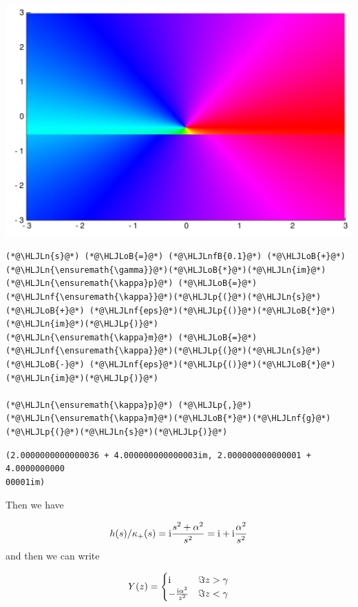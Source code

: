 \documentclass[12pt,a4paper]{article}
\newcommand{\HLJLn}[1]{#1}
\newcommand{\HLJLnf}[1]{\textcolor[RGB]{66,102,213}{#1}}
\newcommand{\HLJLnfB}[1]{\textcolor[RGB]{59,151,46}{#1}}
\newcommand{\HLJLoB}[1]{\textcolor[RGB]{102,102,102}{\textbf{#1}}}
\newcommand{\HLJLp}[1]{#1}
\def\I{ {\rm i} }
\begin{document}
\includegraphics[width=\linewidth]{figures/Solutions4_16_1.pdf}

\begin{lstlisting}
(*@\HLJLn{s}@*) (*@\HLJLoB{=}@*) (*@\HLJLnfB{0.1}@*) (*@\HLJLoB{+}@*) (*@\HLJLn{\ensuremath{\gamma}}@*)(*@\HLJLoB{*}@*)(*@\HLJLn{im}@*) 
(*@\HLJLn{\ensuremath{\kappa}p}@*) (*@\HLJLoB{=}@*) (*@\HLJLnf{\ensuremath{\kappa}}@*)(*@\HLJLp{(}@*)(*@\HLJLn{s}@*) (*@\HLJLoB{+}@*) (*@\HLJLnf{eps}@*)(*@\HLJLp{()}@*)(*@\HLJLoB{*}@*)(*@\HLJLn{im}@*)(*@\HLJLp{)}@*)
(*@\HLJLn{\ensuremath{\kappa}m}@*) (*@\HLJLoB{=}@*) (*@\HLJLnf{\ensuremath{\kappa}}@*)(*@\HLJLp{(}@*)(*@\HLJLn{s}@*) (*@\HLJLoB{-}@*) (*@\HLJLnf{eps}@*)(*@\HLJLp{()}@*)(*@\HLJLoB{*}@*)(*@\HLJLn{im}@*)(*@\HLJLp{)}@*)

(*@\HLJLn{\ensuremath{\kappa}p}@*) (*@\HLJLp{,}@*) (*@\HLJLn{\ensuremath{\kappa}m}@*)(*@\HLJLoB{*}@*)(*@\HLJLnf{g}@*)(*@\HLJLp{(}@*)(*@\HLJLn{s}@*)(*@\HLJLp{)}@*)
\end{lstlisting}

\begin{lstlisting}
(2.0000000000000036 + 4.000000000000003im, 2.000000000000001 + 4.0000000000
00001im)
\end{lstlisting}


Then we have 

\[
h(s)/\kappa_+(s) =  \I {s^2 + \alpha^2 \over s^2} = \I + \I {\alpha^2 \over s^2}
\]
and then we can write

\[
Y(z) = \begin{cases}
\I & \Im z > \gamma \\
-{\I \alpha^2 \over z^2} & \Im z < \gamma
\end{cases}
\]
\end{document}
